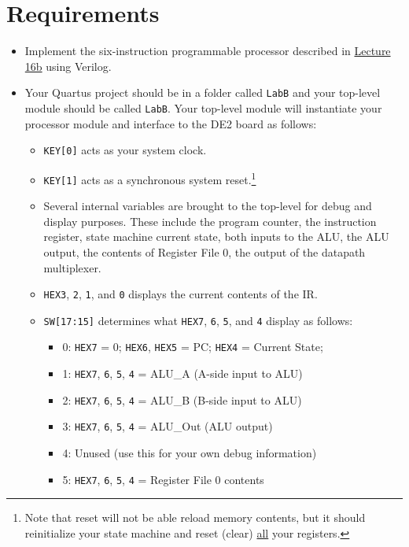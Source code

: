 \section{Requirements} \label{sec:requirements}

\begin{itemize}
    \item Implement the six-instruction programmable processor described in \href{https://moodle.insttech.washington.edu/mod/resource/view.php?id=32929}{Lecture 16b} using Verilog.
    \item Your Quartus project should be in a folder called \verb|LabB| and your top-level module should be called \verb|LabB|.
    Your top-level module will instantiate your processor module and interface to the DE2 board as follows:
    \begin{itemize}
        \item \verb|KEY[0]| acts as your system clock.
        \item \verb|KEY[1]| acts as a synchronous system reset.\footnote{Note that reset will not be able reload memory contents, but it should reinitialize your state machine and reset (clear) \underline{all} your registers.}
        \item Several internal variables are brought to the top-level for debug and display purposes.
        These include the program counter, the instruction register, state machine current state, both inputs to the ALU, the ALU output, the contents of Register File 0, the output of the datapath multiplexer.
        \item \verb|HEX3|, \verb|2|, \verb|1|, and \verb|0| displays the current contents of the IR.
        \item \verb|SW[17:15]| determines what \verb|HEX7|, \verb|6|, \verb|5|, and \verb|4| display as follows:
        \begin{itemize}
            \item 0: \verb|HEX7| = 0; \verb|HEX6|, \verb|HEX5| = PC; \verb|HEX4| = Current State;
            \item 1: \verb|HEX7|, \verb|6|, \verb|5|, \verb|4| = ALU\_A (A-side input to ALU)
            \item 2: \verb|HEX7|, \verb|6|, \verb|5|, \verb|4| = ALU\_B (B-side input to ALU)
            \item 3: \verb|HEX7|, \verb|6|, \verb|5|, \verb|4| = ALU\_Out (ALU output)
            \item 4: Unused (use this for your own debug information)
            \item 5: \verb|HEX7|, \verb|6|, \verb|5|, \verb|4| = Register File 0 contents

\end{itemize}
\end{itemize}
\end{itemize}
